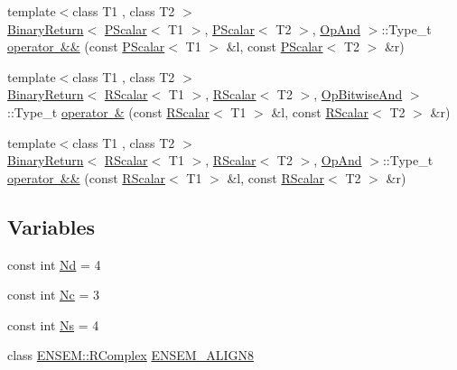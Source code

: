 \begin{DoxyCompactItemize}
\item 
{\footnotesize template$<$class T1 , class T2 $>$ }\\\mbox{\hyperlink{structENSEM_1_1BinaryReturn}{Binary\+Return}}$<$ \mbox{\hyperlink{classENSEM_1_1PScalar}{P\+Scalar}}$<$ T1 $>$, \mbox{\hyperlink{classENSEM_1_1PScalar}{P\+Scalar}}$<$ T2 $>$, \mbox{\hyperlink{structENSEM_1_1OpAnd}{Op\+And}} $>$\+::Type\+\_\+t \mbox{\hyperlink{namespaceENSEM_ga3853388d3b3d994d263d1da57ffcb055}{operator \&\&}} (const \mbox{\hyperlink{classENSEM_1_1PScalar}{P\+Scalar}}$<$ T1 $>$ \&l, const \mbox{\hyperlink{classENSEM_1_1PScalar}{P\+Scalar}}$<$ T2 $>$ \&r)
\item 
{\footnotesize template$<$class T1 , class T2 $>$ }\\\mbox{\hyperlink{structENSEM_1_1BinaryReturn}{Binary\+Return}}$<$ \mbox{\hyperlink{classENSEM_1_1RScalar}{R\+Scalar}}$<$ T1 $>$, \mbox{\hyperlink{classENSEM_1_1RScalar}{R\+Scalar}}$<$ T2 $>$, \mbox{\hyperlink{structENSEM_1_1OpBitwiseAnd}{Op\+Bitwise\+And}} $>$\+::Type\+\_\+t \mbox{\hyperlink{namespaceENSEM_ga389f96c37c3b933acfc68be93291ae0e}{operator \&}} (const \mbox{\hyperlink{classENSEM_1_1RScalar}{R\+Scalar}}$<$ T1 $>$ \&l, const \mbox{\hyperlink{classENSEM_1_1RScalar}{R\+Scalar}}$<$ T2 $>$ \&r)
\item 
{\footnotesize template$<$class T1 , class T2 $>$ }\\\mbox{\hyperlink{structENSEM_1_1BinaryReturn}{Binary\+Return}}$<$ \mbox{\hyperlink{classENSEM_1_1RScalar}{R\+Scalar}}$<$ T1 $>$, \mbox{\hyperlink{classENSEM_1_1RScalar}{R\+Scalar}}$<$ T2 $>$, \mbox{\hyperlink{structENSEM_1_1OpAnd}{Op\+And}} $>$\+::Type\+\_\+t \mbox{\hyperlink{namespaceENSEM_ga142a7a22c88f64f590411925c5c3cdcd}{operator \&\&}} (const \mbox{\hyperlink{classENSEM_1_1RScalar}{R\+Scalar}}$<$ T1 $>$ \&l, const \mbox{\hyperlink{classENSEM_1_1RScalar}{R\+Scalar}}$<$ T2 $>$ \&r)
\end{DoxyCompactItemize}
\subsection*{Variables}
\begin{DoxyCompactItemize}
\item 
const int \mbox{\hyperlink{namespaceENSEM_a016f024340c6231805f8b73f46b808dc}{Nd}} = 4
\item 
const int \mbox{\hyperlink{namespaceENSEM_aabe0c3018e0246aaae1602fa5c08b58a}{Nc}} = 3
\item 
const int \mbox{\hyperlink{namespaceENSEM_a6f05e048f9b2eb1a19131074f8abc25f}{Ns}} = 4
\item 
class \mbox{\hyperlink{classENSEM_1_1RComplex}{E\+N\+S\+E\+M\+::\+R\+Complex}} \mbox{\hyperlink{group__rcomplex_ga253974755fe5c9f74b16a943e4e26ff5}{E\+N\+S\+E\+M\+\_\+\+A\+L\+I\+G\+N8}}
\end{DoxyCompactItemize}



